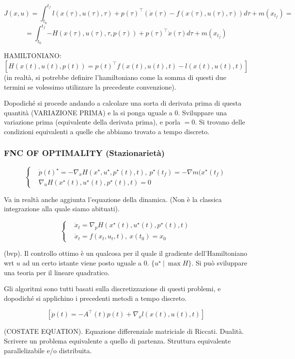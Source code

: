 \[
	J(x,u) = \int_{t_0}^{t_f}{l(x(\tau),u(\tau),\tau) + p(\tau)^\top (\dot{x}(\tau)- f(x(\tau),u(\tau),\tau))d\tau} + m(x_{t_f}) =
\]
\[
	= \int_{t_0}^{t_f}{-H(x(\tau),u(\tau),\tau,p(\tau)) + p(\tau)^\top \dot{x}(\tau)d\tau} + m(x_{t_f})
\]

HAMILTONIANO:
\[
	[H(x(t),u(t),p(t)) = p(t)^\top f(x(t),u(t),t) - l(x(t),u(t),t)]
\]
(in realtà, si potrebbe definire l'hamiltoniano come la somma di questi due termini se volessimo utilizzare la precedente convenzione).

Dopodiché si procede andando a calcolare una sorta di derivata prima di questa quantità (VARIAZIONE PRIMA) e la si ponga uguale a 0. Sviluppare una variazione prima (equivalente della derivata prima), e porla $= 0$. Si trovano delle condizioni equivalenti a quelle che abbiamo trovato a tempo discreto.

\subsubsection{FNC OF OPTIMALITY (Stazionarietà)}

\[
	\left\{
	\begin{aligned}
	&\dot{p}(t)^\star = -\nabla_x{H(x^\star,u^\star,p^\star(t),t)},\ p^\star(t_f) = -\nabla{m(x^\star(t_f)}\\
	&\nabla_u{H(x^\star(t),u^\star(t),p^\star(t),t)}= 0
	\end{aligned}
	\right.
\]

Va in realtà anche aggiunta l'equazione della dinamica. (Non è la classica integrazione alla quale siamo abituati).

\[
	\left\{
	\begin{aligned}
	&\dot{x}_t = \nabla_p{H(x^\star(t),u^\star(t),p^\star(t),t)}\\
	&\dot{x}_t = f(x_t,u_t,t),\ x(t_0) = x_0
	\end{aligned}
	\right.
\]

(bvp). Il controllo ottimo è un qualcosa per il quale il gradiente dell'Hamiltoniano wrt $u$ ad un certo istante viene posto uguale a 0. $\{u^\star\ |\ \max{H}\}$. Si può sviluppare una teoria per il lineare quadratico.

Gli algoritmi sono tutti basati sulla discretizzazione di questi problemi, e dopodiché si applichino i precedenti metodi a tempo discreto.

\[
	[\dot{p}(t) = -A^\top (t)p(t) + \nabla_x{l(x(t),u(t),t)}]
\]

(COSTATE EQUATION). Equazione differenziale matriciale di Riccati. Dualità. Scrivere un problema equivalente a quello di partenza. Struttura equivalente parallelizabile e/o distribuita.

